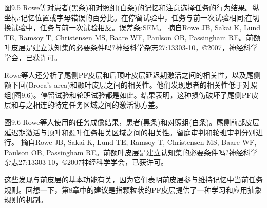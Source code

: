 \par
图9.5 Rowe等对患者(黑条)和对照组(白条)的记忆和注意选择任务的行为结果。纵坐标:记忆位置或字母错误的百分比。在停留试验中，任务与前一次试验相同;在切换试验中，任务与前一次试验相反。误差条:SEM。
摘自Rowe JB, Sakai K, Lund TE, Ramsoy T, Christensen MS, Baare WF, Paulson OB, Passingham RE。前额叶皮层是建立认知集的必要条件吗?神经科学杂志27:13303-10，©2007，神经科学学会，已获许可。
\par
Rowe等人还分析了尾侧PF皮层和后顶叶皮层延迟期激活之间的相关性，以及尾侧额下回(Broca’s area)和颞叶皮层之间的相关性。他们发现患者的相关性低于对照组(图9.6)。停留试验和轮班试验都是如此。结果表明，这种损伤破坏了尾侧PF皮层和与之相连的特定任务区域之间的激活协方差。
\par
图9.6 Rowe等人使用的任务成像结果，患者(黑条)和对照组(白条)。尾侧前部皮层延迟期激活与顶叶和颞叶任务相关区域之间的相关性。留庭审判和轮班审判分别进行。
摘自Rowe JB, Sakai K, Lund TE, Ramsoy T, Christensen MS, Baare WF, Paulson OB, Passingham RE。前额叶皮层是建立认知集的必要条件吗?神经科学杂志27:13303-10，©2007神经科学学会，已获许可。
\par
这些发现与前皮层的基本功能有关，因为它们表明前皮层参与维持记忆中当前任务规则。回想一下，第8章中的建议是指颗粒状的PF皮层提供了一种学习和应用抽象规则的机制。
